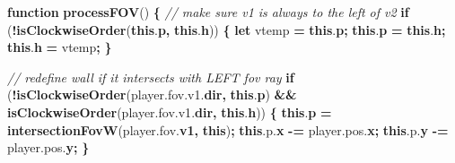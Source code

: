 \documentclass[11pt,french,a4paper,]{article}
\newenvironment{Shaded}{\begin{snugshade}}{\end{snugshade}}
\newcommand{\AttributeTok}[1]{\textcolor[rgb]{0.00,0.36,0.77}{\textbf{#1}}}
\newcommand{\CommentTok}[1]{\textcolor[rgb]{0.35,0.35,0.35}{\textit{#1}}}
\newcommand{\ControlFlowTok}[1]{\textcolor[rgb]{0.68,0.35,0.62}{\textbf{#1}}}
\newcommand{\KeywordTok}[1]{\textcolor[rgb]{0.68,0.35,0.62}{\textbf{#1}}}
\newcommand{\NormalTok}[1]{#1}
\newcommand{\OperatorTok}[1]{\textcolor[rgb]{0.81,0.36,0.00}{\textbf{#1}}}
\newcommand{\VariableTok}[1]{\textcolor[rgb]{0.90,0.33,0.00}{#1}}
\begin{document}
\begin{Shaded}
\begin{Highlighting}[]
\KeywordTok{function} \AttributeTok{processFOV}\NormalTok{() }\OperatorTok{\{}
    \CommentTok{// make sure v1 is always to the left of v2}
    \ControlFlowTok{if}\NormalTok{ (}\OperatorTok{!}\AttributeTok{isClockwiseOrder}\NormalTok{(}\KeywordTok{this}\NormalTok{.}\AttributeTok{p}\OperatorTok{,} \KeywordTok{this}\NormalTok{.}\AttributeTok{h}\NormalTok{)) }\OperatorTok{\{}
        \KeywordTok{let}\NormalTok{ vtemp }\OperatorTok{=} \KeywordTok{this}\NormalTok{.}\AttributeTok{p}\OperatorTok{;}
        \KeywordTok{this}\NormalTok{.}\AttributeTok{p} \OperatorTok{=} \KeywordTok{this}\NormalTok{.}\AttributeTok{h}\OperatorTok{;}
        \KeywordTok{this}\NormalTok{.}\AttributeTok{h} \OperatorTok{=}\NormalTok{ vtemp}\OperatorTok{;}
    \OperatorTok{\}}

    \CommentTok{//  redefine wall if it intersects with LEFT fov ray}
    \ControlFlowTok{if}\NormalTok{ (}\OperatorTok{!}\AttributeTok{isClockwiseOrder}\NormalTok{(}\VariableTok{player}\NormalTok{.}\VariableTok{fov}\NormalTok{.}\VariableTok{v1}\NormalTok{.}\AttributeTok{dir}\OperatorTok{,} \KeywordTok{this}\NormalTok{.}\AttributeTok{p}\NormalTok{) }\OperatorTok{&&}
            \AttributeTok{isClockwiseOrder}\NormalTok{(}\VariableTok{player}\NormalTok{.}\VariableTok{fov}\NormalTok{.}\VariableTok{v1}\NormalTok{.}\AttributeTok{dir}\OperatorTok{,} \KeywordTok{this}\NormalTok{.}\AttributeTok{h}\NormalTok{)) }\OperatorTok{\{}
        \KeywordTok{this}\NormalTok{.}\AttributeTok{p} \OperatorTok{=} \AttributeTok{intersectionFovW}\NormalTok{(}\VariableTok{player}\NormalTok{.}\VariableTok{fov}\NormalTok{.}\AttributeTok{v1}\OperatorTok{,} \KeywordTok{this}\NormalTok{)}\OperatorTok{;}
        \KeywordTok{this}\NormalTok{.}\VariableTok{p}\NormalTok{.}\AttributeTok{x} \OperatorTok{-=} \VariableTok{player}\NormalTok{.}\VariableTok{pos}\NormalTok{.}\AttributeTok{x}\OperatorTok{;}
        \KeywordTok{this}\NormalTok{.}\VariableTok{p}\NormalTok{.}\AttributeTok{y} \OperatorTok{-=} \VariableTok{player}\NormalTok{.}\VariableTok{pos}\NormalTok{.}\AttributeTok{y}\OperatorTok{;}
    \OperatorTok{\}}


\end{Highlighting}
\end{Shaded}
\end{document}
